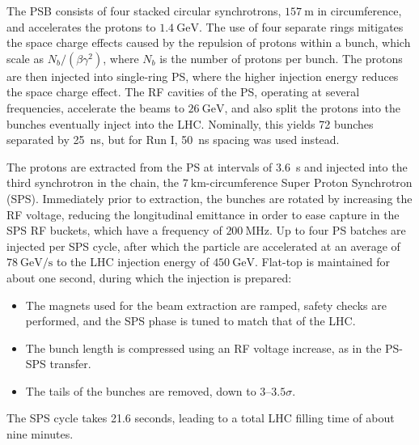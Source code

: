 The PSB consists of four stacked circular synchrotrons, $\SI{157}{\meter}$ in circumference, and accelerates the protons to $\SI{1.4}{\giga\electronvolt}$. The use of four separate rings mitigates the space charge effects caused by the repulsion of protons within a bunch, which scale as $N_b/(\beta\gamma^2)$, where $N_b$ is the number of protons per bunch. The protons are then injected into single-ring PS, where the higher injection energy reduces the space charge effect. The RF cavities of the PS, operating at several frequencies, accelerate the beams to $\SI{26}{\giga\electronvolt}$, and also split the protons into the bunches eventually inject into the LHC. Nominally, this yields 72 bunches separated by \SI{25}{\nano\second}, but for Run I, \SI{50}{\nano\second} spacing was used instead. 

The protons are extracted from the PS at intervals of \SI{3.6}{\second} and injected into the third synchrotron in the chain, the $\SI{7}{\kilo\meter}$-circumference Super Proton Synchrotron (SPS). Immediately prior to extraction, the bunches are rotated by increasing the RF voltage, reducing the longitudinal emittance in order to ease capture in the SPS RF buckets, which have a frequency of $\SI{200}{\mega\hertz}$.  Up to four PS batches are injected per SPS cycle, after which the particle are accelerated at an average of $\SI[per-mode=symbol]{78}{\giga\electronvolt\per\second}$ to the LHC injection energy of $\SI{450}{\giga\electronvolt}$. Flat-top is maintained for about one second, during which the injection is prepared:

\begin{itemize}
	\item The magnets used for the beam extraction are ramped, safety checks are performed, and the SPS phase is tuned to match that of the LHC.
	\item The bunch length is compressed using an RF voltage increase, as in the PS-SPS transfer.
	\item The tails of the bunches are removed, down to $3$--$3.5\sigma$.
\end{itemize}

The SPS cycle takes 21.6 seconds, leading to a total LHC filling time of about nine minutes.

